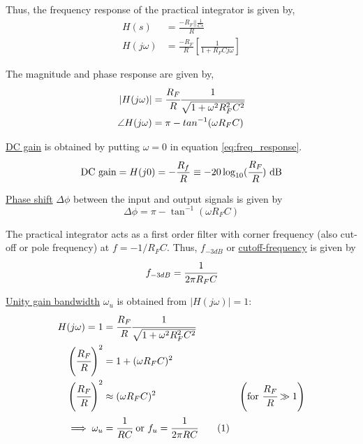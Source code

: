 \documentclass[12pt, titlepage]{article}
\theoremstyle{definition}
\newcommand\numberthis{\addtocounter{equation}{1}\tag{\theequation}}
\begin{document}
    Thus, the frequency response of the practical integrator is given by,
    \begin{align}
      H(s) &= \frac{-R_{F} || \frac{1}{Cs}}{R} \\
      H(j\omega) &= \frac{-R_{F}}{R} \left[ \frac{1}{1+R_{F}Cj\omega} \right] \label{eq:freq_response}
    \end{align}

    The magnitude and phase response are given by,
    \begin{align*}
    |H(j\omega)| &= \cfrac{R_{F}}{R}\cfrac{1}{\sqrt{1+\omega^{2}R_{F}^{2}C^{2}}} \\
    \angle H(j\omega) &= \pi - tan^{-1}(\omega R_{F}C)
    \end{align*}

    \underline{DC gain} is obtained by putting $\omega = 0$ in equation \ref{eq:freq_response}.
    \begin{equation}
      \text{DC gain} = H(j0) = -\frac{R_f}{R} \equiv -20\log_{10}(\cfrac{R_F}{R}) \text{ dB}
    \end{equation}

    \underline{Phase shift} $\Delta\phi$ between the input and output signals is given by
    \begin{equation}\label{eq:phase_shift}
      \Delta\phi = \pi - \tan^{-1}(\omega R_FC)
    \end{equation}

    The practical integrator acts as a first order filter with corner frequency (also cut-off or pole frequency) at $f = -1/R_FC$.
    Thus, \underline{$f_{-3dB}$} or \underline{cutoff-frequency} is given by
    \begin{equation}\label{eq:f3db}
      f_{-3dB} = \cfrac{1}{2\pi R_FC}
    \end{equation}

    \underline{Unity gain bandwidth} $\omega_u$ is obtained from $|H(j\omega)| = 1$:
    \begin{align*}
      H(j\omega) = 1 &= \cfrac{R_{F}}{R}\cfrac{1}{\sqrt{1+\omega^{2}R_{F}^{2}C^{2}}} \\
      \left(\cfrac{R_F}{R}\right)^2 &= 1 + (\omega R_FC)^2 \\
      \left(\cfrac{R_F}{R}\right)^2 &\approx (\omega R_FC)^2 & \left(\text{for } \cfrac{R_F}{R} \gg 1\right)\\
      \implies \omega_u &= \cfrac{1}{RC} \text{ or } f_u = \cfrac{1}{2\pi RC}\numberthis \label{eq:unity_gain_bw}
    \end{align*}
\end{document}
